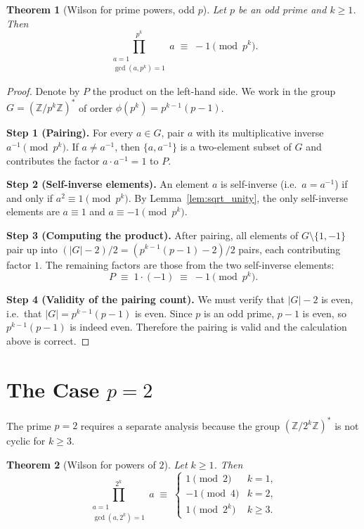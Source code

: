 \documentclass[12pt,a4paper]{amsart}
\newtheorem{theorem}{Theorem}[section]
\theoremstyle{definition}
\newcommand{\Z}{\mathbb{Z}}
\begin{document}
\begin{theorem}[Wilson for prime powers, odd $p$]\label{thm:wilson_pk_odd}
  Let $p$ be an odd prime and $k \geq 1$.  Then
  \[
    \prod_{\substack{a=1\\\gcd(a,p^k)=1}}^{p^k} a
    \;\equiv\; -1 \pmod{p^k}.
  \]
\end{theorem}

\begin{proof}
  Denote by $P$ the product on the left-hand side.  We work in the group
  $G = (\Z/p^k\Z)^*$ of order $\phi(p^k) = p^{k-1}(p-1)$.

  \textbf{Step 1 (Pairing).}
  For every $a \in G$, pair $a$ with its multiplicative inverse
  $a^{-1} \pmod{p^k}$.  If $a \neq a^{-1}$, then $\{a, a^{-1}\}$ is a
  two-element subset of $G$ and contributes the factor $a \cdot a^{-1} = 1$
  to $P$.

  \textbf{Step 2 (Self-inverse elements).}
  An element $a$ is self-inverse (i.e.\ $a = a^{-1}$) if and only if
  $a^2 \equiv 1 \pmod{p^k}$.  By Lemma~\ref{lem:sqrt_unity}, the only
  self-inverse elements are $a \equiv 1$ and $a \equiv -1 \pmod{p^k}$.

  \textbf{Step 3 (Computing the product).}
  After pairing, all elements of $G \setminus \{1, -1\}$ pair up into
  $(|G| - 2)/2 = (p^{k-1}(p-1) - 2)/2$ pairs, each contributing factor $1$.
  The remaining factors are those from the two self-inverse elements:
  \[
    P \;\equiv\; 1 \cdot (-1) \;\equiv\; -1 \pmod{p^k}.
  \]

  \textbf{Step 4 (Validity of the pairing count).}
  We must verify that $|G| - 2$ is even, i.e.\ that $|G| = p^{k-1}(p-1)$
  is even.  Since $p$ is an odd prime, $p - 1$ is even, so $p^{k-1}(p-1)$
  is indeed even.  Therefore the pairing is valid and the calculation above
  is correct.
\end{proof}

\section{The Case \texorpdfstring{$p = 2$}{p = 2}}

The prime $p = 2$ requires a separate analysis because the group
$(\Z/2^k\Z)^*$ is not cyclic for $k \geq 3$.

\begin{theorem}[Wilson for powers of $2$]\label{thm:wilson_pk_2}
  Let $k \geq 1$.  Then
  \[
    \prod_{\substack{a=1\\\gcd(a,2^k)=1}}^{2^k} a
    \;\equiv\;
    \begin{cases}
      1  \pmod{2}   & k = 1, \\
      -1 \pmod{4}   & k = 2, \\
      1  \pmod{2^k} & k \geq 3.
    \end{cases}
  \]
\end{theorem}
\end{document}
